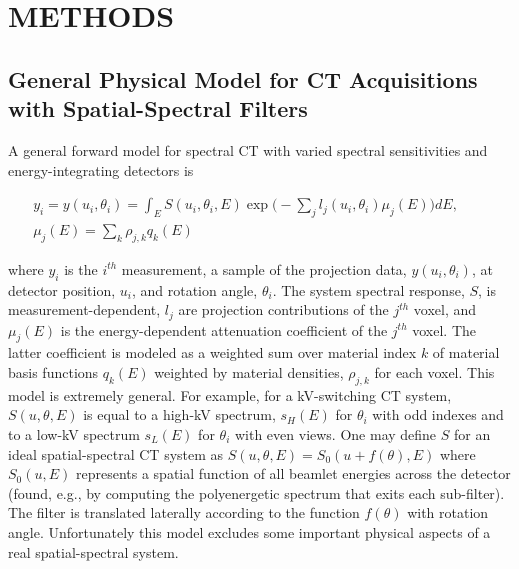 \documentclass[]{spie}  %
\begin{document}
\FloatBarrier

\section{METHODS}

\subsection{General Physical Model for CT Acquisitions with Spatial-Spectral Filters}

A general forward model for spectral CT with varied spectral sensitivities and energy-integrating detectors is


\setlength{\abovedisplayskip}{0pt}
\setlength{\belowdisplayskip}{3pt}
\setlength{\abovedisplayshortskip}{0pt}
\setlength{\belowdisplayshortskip}{3pt}

\begin{gather}
	y_i = y(u_i,\theta_i) = \int_E S(u_i,\theta_i,E) \exp{\Big(-\sum_j l_j(u_i,\theta_i)  \mu_j(E) \Big)} dE, \quad \quad \\
	\mu_j(E) = \sum_k  {\rho}_{j,k} q_k(E) 
\end{gather}

\noindent where $y_i$ is the $i^{th}$ measurement, a sample of the projection data, $y(u_i,\theta_i)$, at detector position, $u_i$, and rotation angle, $\theta_i$. The system spectral response, $S$, is measurement-dependent, $l_j$ are projection contributions of the $j^{th}$ voxel, and $\mu_j(E)$ is the energy-dependent attenuation coefficient of the $j^{th}$  voxel. The latter coefficient is modeled as a weighted sum over material index $k$ of material basis functions $q_k(E)$ weighted by material densities, $\rho_{j,k}$ for each voxel. This model is extremely general. For example, for a kV-switching CT system, $S(u,\theta, E)$ is equal to a high-kV spectrum, $s_H(E)$ for $\theta_i$ with odd indexes and to a low-kV spectrum $s_L(E)$ for $\theta_i$ with even views.
One may define $S$ for an ideal spatial-spectral CT system as $S(u,\theta,E) = S_0(u+f(\theta),E)$ where $S_0(u,E)$ represents a spatial function of all beamlet energies across the detector (found, e.g., by computing the polyenergetic spectrum that exits each sub-filter). The filter is translated laterally according to the function $f(\theta)$ with rotation angle. Unfortunately this model excludes some important physical aspects of a real spatial-spectral system.
\end{document}
